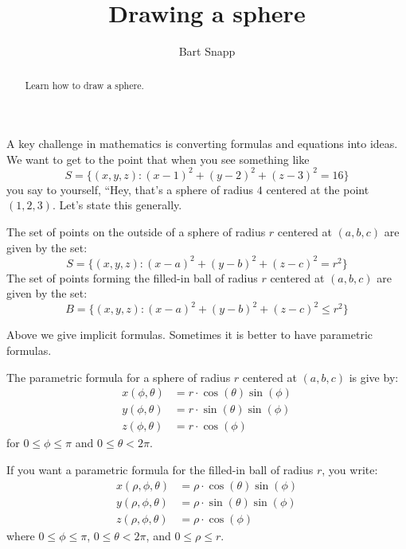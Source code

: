 \documentclass{ximera}
\author{Bart Snapp}
\title[Dig-In:]{Drawing a sphere}
\begin{document}
\begin{abstract}
  Learn how to draw a sphere.
\end{abstract}
\maketitle

A key challenge in mathematics is converting formulas and equations
into ideas. We want to get to the point that when you see something
like
\[
S = \{(x,y,z):(x-1)^2+(y-2)^2+(z-3)^2=16\}
\]
you say to yourself, ``Hey, that's a sphere of radius $4$ centered at
the point $(1,2,3)$. Let's state this generally.
\begin{theorem}
  The set of points on the outside of a sphere of radius $r$
  centered at $(a,b,c)$ are given by the set:
  \[
  S = \{(x,y,z):(x-a)^2+(y-b)^2+(z-c)^2=r^2\}
  \]
  The set of points forming the filled-in ball of radius $r$ centered
  at $(a,b,c)$ are given by the set:
  \[
  B = \{(x,y,z):(x-a)^2+(y-b)^2+(z-c)^2\le r^2\}
  \]
\end{theorem}
Above we give implicit formulas. Sometimes it is better to have
parametric formulas.
\begin{theorem}
  The parametric formula for a sphere of radius $r$ centered at
  $(a,b,c)$ is give by:
  \begin{align*}
    x(\phi,\theta) &=r\cdot\cos(\theta)\sin(\phi)\\
    y(\phi,\theta) &=r\cdot\sin(\theta)\sin(\phi)\\
    z(\phi,\theta) &=r\cdot\cos(\phi)
  \end{align*}
  for $0\le \phi\le \pi$ and $0\le\theta< 2\pi$.

  If you want a parametric formula for the filled-in ball of radius
  $r$, you write:
  \begin{align*}
    x(\rho,\phi,\theta) &=\rho\cdot\cos(\theta)\sin(\phi)\\
    y(\rho,\phi,\theta) &=\rho\cdot\sin(\theta)\sin(\phi)\\
    z(\rho,\phi,\theta) &=\rho\cdot\cos(\phi)
  \end{align*}
  where  $0\le \phi\le \pi$, $0\le\theta< 2\pi$, and $0\le \rho\le r$.
\end{theorem}
  
\end{document}

